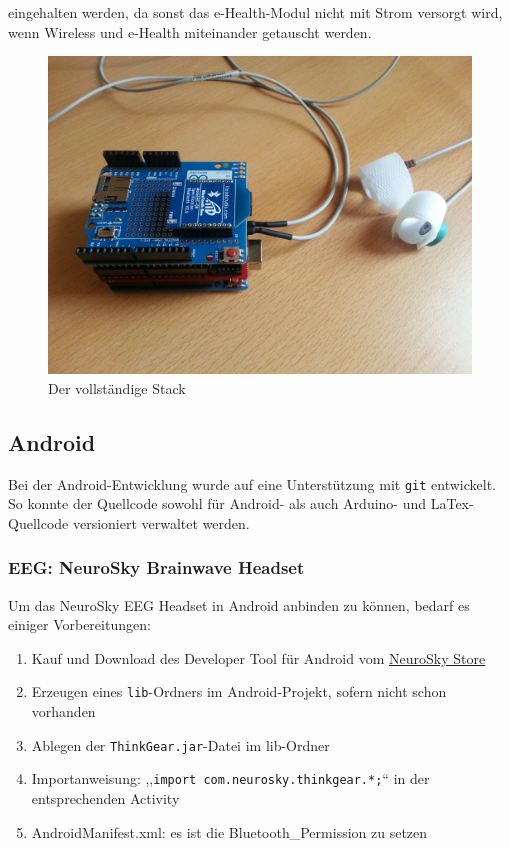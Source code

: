 \documentclass[10pt, a4paper, oneside, titlepage]{scrartcl} %
\begin{document}
	eingehalten werden, da sonst das e-Health-Modul nicht mit Strom versorgt wird, wenn Wireless und e-Health miteinander getauscht werden. 
	
	\begin{figure}[hbtp]
	\centering
	\includegraphics[scale=0.1]{img/completeStack.jpg}
	\caption{Der vollständige Stack}
	\label{fig:completeStack}
	\end{figure}
	
	
	\newpage
	\subsection{Android}
	
	Bei der Android-Entwicklung wurde auf eine Unterstützung mit \texttt{git} entwickelt. So konnte der Quellcode sowohl für Android- als auch Arduino- und LaTex-Quellcode versioniert verwaltet werden.
	
	\subsubsection{EEG: NeuroSky Brainwave Headset}
	
	Um das NeuroSky EEG Headset in Android anbinden zu können, bedarf es einiger Vorbereitungen:
	\begin{enumerate}
	\item Kauf und Download des Developer Tool für Android vom \href{http://store.neurosky.com/products/developer-tools-3-android} {NeuroSky Store}
	\item Erzeugen eines \texttt{lib}-Ordners im Android-Projekt, sofern nicht schon vorhanden
	\item Ablegen der \texttt{ThinkGear.jar}-Datei im lib-Ordner
	\item Importanweisung: ,,\texttt{import com.neurosky.thinkgear.*;}`` in der entsprechenden Activity
	\item AndroidManifest.xml: es ist die Bluetooth\_Permission zu setzen
	\end{enumerate}
	
\end{document}
